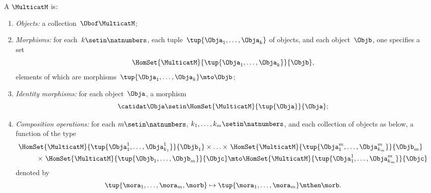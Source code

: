 \begin{ctdefinition}[Multicategory]
    \label{def:multicategory}
    A  $\MulticatM$ is:

    \constit
    \begin{enumerate}
        \item \emph{Objects:} a collection~$\Obof\MulticatM$;
        \item \emph{Morphisms:} for each~$k \setin \natnumbers$, each tuple~$\tup{\Obja_1,\ldots, \Obja_k}$ of objects, and each object~$ \Objb$, one specifies a set~
        \begin{equation}
\HomSet{\MulticatM}{\tup{\Obja_1,\ldots,\Obja_k}}{\Objb},
\end{equation}
elements of which are morphisms~$\tup{\Obja_1,\ldots,\Obja_k}\mto \Objb$;
        \item \emph{Identity morphisms:} for each object~$\Obja$, a morphism
              \begin{equation}
                  \catidat\Obja \setin \HomSet{\MulticatM}{\tup{\Obja}}{\Obja};
              \end{equation}
        \item \emph{Composition operations:} for each $m \setin \natnumbers$, $k_1, \dots, k_m \setin \natnumbers$, and each collection of objects as below, a function of the type
              \begin{equation}
                  \begin{aligned}
                      \HomSet{\MulticatM}{ \tup{\Obja_{1}^1, \ldots, \Obja_{k_1}^1} }{\Objb_1}   \times \ldots \times & \ \HomSet{\MulticatM}{ \tup{\Obja_{1}^m, \ldots, \Obja_{k_m}^m} }{\Objb_m}  \\
                     \qquad \times \  \HomSet{\MulticatM}{ \tup{\Objb_{1}, \ldots,\Objb_{m}} }{\Objc} & \mto \HomSet{\MulticatM}{\tup{\Obja_{1}^1, \ldots, \Obja_{k_m}^m}}{\Objc} 
                  \end{aligned}
                   \end{equation}
                  denoted by
                  \begin{equation}
\tup{\mora_1,\ldots,\mora_m,\morb}                                                                                                                                                                                   \mapsto \tup{\mora_1,\ldots, \mora_m}\mthen \morb.
\end{equation}
    \end{enumerate}
    \condit
    \begin{enumerate}

\end{enumerate}
\end{ctdefinition}
